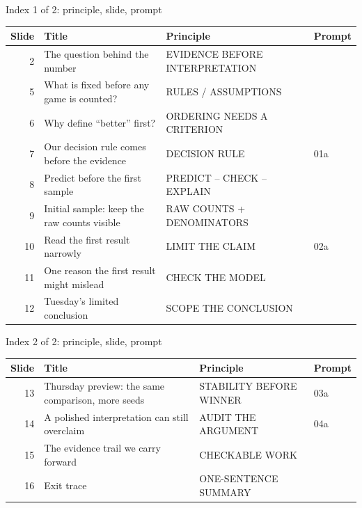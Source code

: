 \begin{frame}{Index 1 of 2: principle, slide, prompt}
\scriptsize
\begin{tabular}{@{}r>{\raggedright\arraybackslash}p{5.1cm}>{\raggedright\arraybackslash}p{4.6cm}p{1.2cm}@{}}
\textbf{Slide} & \textbf{Title} & \textbf{Principle} & \textbf{Prompt}\\\midrule
2 & The question behind the number & EVIDENCE BEFORE INTERPRETATION & \\
5 & What is fixed before any game is counted? & RULES / ASSUMPTIONS & \\
6 & Why define ``better'' first? & ORDERING NEEDS A CRITERION & \\
7 & Our decision rule comes before the evidence & DECISION RULE & 01a\\
8 & Predict before the first sample & PREDICT -- CHECK -- EXPLAIN & \\
9 & Initial sample: keep the raw counts visible & RAW COUNTS + DENOMINATORS & \\
10 & Read the first result narrowly & LIMIT THE CLAIM & 02a\\
11 & One reason the first result might mislead & CHECK THE MODEL & \\
12 & Tuesday's limited conclusion & SCOPE THE CONCLUSION & \\
\end{tabular}
\end{frame}
\begin{frame}{Index 2 of 2: principle, slide, prompt}
\scriptsize
\begin{tabular}{@{}r>{\raggedright\arraybackslash}p{5.1cm}>{\raggedright\arraybackslash}p{4.6cm}p{1.2cm}@{}}
\textbf{Slide} & \textbf{Title} & \textbf{Principle} & \textbf{Prompt}\\\midrule
13 & Thursday preview: the same comparison, more seeds & STABILITY BEFORE WINNER & 03a\\
14 & A polished interpretation can still overclaim & AUDIT THE ARGUMENT & 04a\\
15 & The evidence trail we carry forward & CHECKABLE WORK & \\
16 & Exit trace & ONE-SENTENCE SUMMARY & \\
\end{tabular}
\end{frame}
